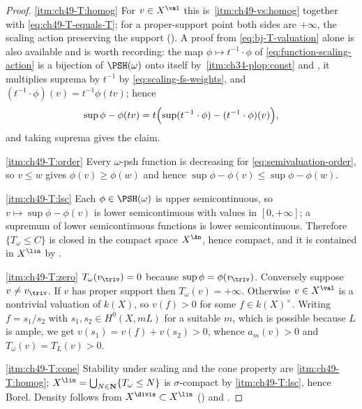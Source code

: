 \begin{proof}
\cref{itm:ch49-T:homog}  For $v\in X^{\val}$ this is
\,\cref{itm:ch49-vs:homog} together with
\eqref{eq:ch49-T-equals-T}; for a proper-support point both sides are
$+\infty$, the scaling action preserving the support
().  A proof from
\eqref{eq:bj-T-valuation} alone is also available and is worth recording:
the map $\phi\mapsto t^{-1}\cdot\phi$ of
\eqref{eq:function-scaling-action} is a bijection of $\PSH(\omega)$ onto
itself by \,\cref{itm:ch34-plop:const} and
, it multiplies suprema by $t^{-1}$ by
\eqref{eq:scaling-fs-weights}, and
$(t^{-1}\cdot\phi)(v)=t^{-1}\phi(tv)$; hence
\[
 \sup\phi-\phi(tv)
 =t\Bigl(\sup(t^{-1}\cdot\phi)-(t^{-1}\cdot\phi)(v)\Bigr),
\]
and taking suprema gives the claim.

\cref{itm:ch49-T:order}  Every $\omega$-psh function is decreasing for
\eqref{eq:semivaluation-order}, so $v\le w$ gives
$\phi(v)\ge\phi(w)$ and hence
$\sup\phi-\phi(v)\le\sup\phi-\phi(w)$.

\cref{itm:ch49-T:lsc}  Each $\phi\in\PSH(\omega)$ is upper
semicontinuous, so $v\mapsto\sup\phi-\phi(v)$ is lower semicontinuous
with values in $[0,+\infty]$; a supremum of lower semicontinuous
functions is lower semicontinuous.  Therefore $\{T_\omega\le C\}$ is
closed in the compact space $X^{\An}$, hence compact, and it is contained
in $X^{\lin}$ by .

\cref{itm:ch49-T:zero}  $T_\omega(v_{\triv})=0$ because
$\sup\phi=\phi(v_{\triv})$.  Conversely suppose $v\ne v_{\triv}$.  If
$v$ has proper support then $T_\omega(v)=+\infty$.  Otherwise
$v\in X^{\val}$ is a nontrivial valuation of $k(X)$, so $v(f)>0$ for
some $f\in k(X)^\times$.  Writing $f=s_1/s_2$ with
$s_1,s_2\in H^0(X,mL)$ for a suitable $m$, which is possible because
$L$ is ample, we get $v(s_1)=v(f)+v(s_2)>0$, whence
$a_m(v)>0$ and $T_\omega(v)=T_L(v)>0$.

\cref{itm:ch49-T:cone}  Stability under scaling and the cone property are
\cref{itm:ch49-T:homog}; $X^{\lin}=\bigcup_{N\in\mathbf N}\{T_\omega\le N\}$
is $\sigma$-compact by \cref{itm:ch49-T:lsc}, hence Borel.  Density
follows from $X^{\divis}\subset X^{\lin}$
() and
.
\end{proof}

